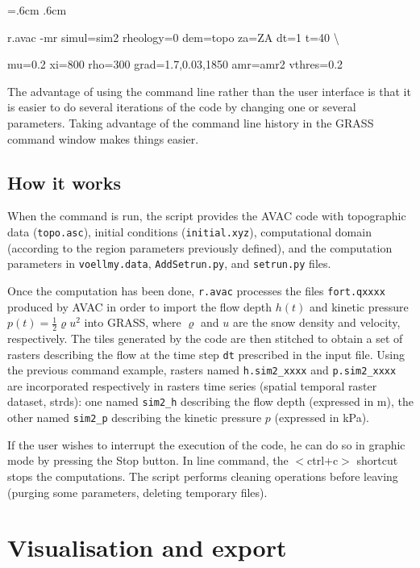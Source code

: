 \documentclass[12pt,oneside]{paper}
\newenvironment{code}{%
\vspace{2mm}%
\hangindent=.6cm%
\parindent.6cm%
\ttfamily%
\color{gris.3}%
}{
\vspace{2mm}%
}
\begin{document}
\french
\begin{code}
r.avac -mr simul=sim2 rheology=0 dem=topo za=ZA dt=1 t=40 \backslash

mu=0.2 xi=800 rho=300 grad=1.7,0.03,1850 amr=amr2 vthres=0.2
\end{code}
\english

The advantage of using the command line rather than the user interface is that it is easier to do several iterations of the code by changing one or several parameters. Taking advantage of the command line history in the GRASS command window makes things easier.

\subsection{How it works}

When the command is run, the script provides the AVAC code with topographic data (\verb+topo.asc+), initial conditions (\verb+initial.xyz+), computational domain (according to the region parameters previously defined), and the computation parameters in \verb+voellmy.data+, \verb+AddSetrun.py+, and \verb+setrun.py+ files.

Once the computation has been done, \verb+r.avac+ processes the files \texttt{fort.qxxxx} produced by AVAC in order to import the flow depth $h(t)$ and kinetic pressure $p(t)=\frac{1}{2}\varrho u^2$ into GRASS, where $\varrho$ and $u$ are the snow density and velocity, respectively. The tiles generated by the code are then stitched to obtain a set of rasters describing the flow at the time step \texttt{dt} prescribed in the input file. Using the previous command example, rasters named \texttt{h.sim2\_xxxx} and \texttt{p.sim2\_xxxx} are incorporated respectively in rasters time series (spatial temporal raster dataset, strds): one named \texttt{sim2\_h} describing the flow depth (expressed in m), the other named \texttt{sim2\_p} describing the kinetic pressure $p$ (expressed in kPa).

If the user wishes to interrupt the execution of the code, he can do so in graphic mode by pressing the Stop button. In line command,  the $<$ctrl+c$>$ shortcut stops the computations. The script performs cleaning operations before leaving (purging some parameters, deleting temporary files).

\section{Visualisation and export}
\end{document}
